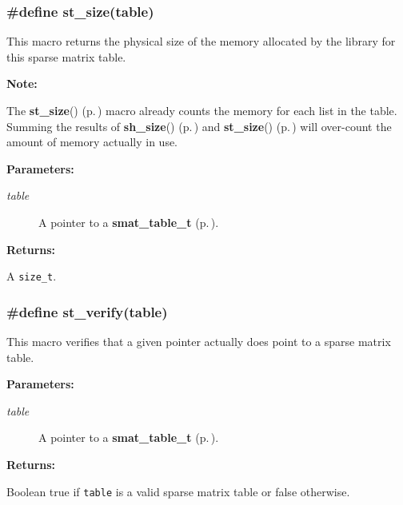 \subsubsection{\setlength{\rightskip}{0pt plus 5cm}\#define st\_\-size(table)}\label{group__dbprim__smat_a28}




 This macro returns the physical size of the memory allocated by the library for this sparse matrix table.

\begin{Desc}
\item[{\bf Note: }]\par
The {\bf st\_\-size}() {\rm (p.\,\pageref{group__dbprim__smat_a28})} macro already counts the memory for each list in the table. Summing the results of {\bf sh\_\-size}() {\rm (p.\,\pageref{group__dbprim__smat_a38})} and {\bf st\_\-size}() {\rm (p.\,\pageref{group__dbprim__smat_a28})} will over-count the amount of memory actually in use.\end{Desc}
\begin{Desc}
\item[{\bf Parameters: }]\par
\begin{description}
\item[
{\em table}]A pointer to a {\bf smat\_\-table\_\-t} {\rm (p.\,\pageref{group__dbprim__smat_a0})}.

\end{description}
\end{Desc}
\begin{Desc}
\item[{\bf Returns: }]\par
A {\tt size\_\-t}. \end{Desc}
\subsubsection{\setlength{\rightskip}{0pt plus 5cm}\#define st\_\-verify(table)}\label{group__dbprim__smat_a22}




 This macro verifies that a given pointer actually does point to a sparse matrix table.\begin{Desc}
\item[{\bf Parameters: }]\par
\begin{description}
\item[
{\em table}]A pointer to a {\bf smat\_\-table\_\-t} {\rm (p.\,\pageref{group__dbprim__smat_a0})}.

\end{description}
\end{Desc}
\begin{Desc}
\item[{\bf Returns: }]\par
Boolean true if {\tt table} is a valid sparse matrix table or false otherwise. \end{Desc}



